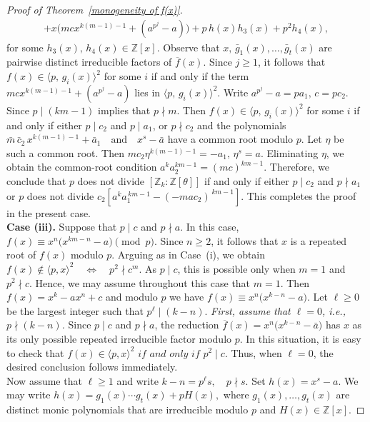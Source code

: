 \documentclass[10pt,a4paper]{amsart}
\newcommand{\Z}{\mathbb{Z}}
\begin{document}
\begin{proof}[Proof of Theorem~\ref{monogeneity of f(x)}]
\begin{align*}
   + x\bigl(m c x^{k(m-1)-1} + (a^{p^{j}}-a)\bigr)
   + p\,h(x)h_{3}(x) + p^{2}h_{4}(x),
\end{align*}
for some $h_{3}(x),\,h_{4}(x)\in\mathbb{Z}[x]$. Observe that $x,\,\bar g_{1}(x),\ldots,\bar g_{t}(x)$ are pairwise distinct irreducible factors of $\overline{f}(x)$.
Since $j\ge1$, it follows that $f(x)\in\langle p,\, g_i(x)\rangle^{2}$
for some $i$ if and only if the term $m c x^{k(m-1)-1} + (a^{p^{j}}-a)$ lies in $\langle p,\, g_i(x)\rangle^{2}$. Write $a^{p^{j}}-a=pa_{1},\,c=pc_{2}.$ Since $p\mid (km-1)$ implies that $p\nmid m$. Then $f(x)\in\langle p,\, g_i(x)\rangle^{2}$ for some $i$ if and only if either $p\mid c_{2}$ and $p\mid a_{1}$, or $p\nmid c_{2}$ and the polynomials $\bar m\,\bar c_{2}\,x^{k(m-1)-1}+\bar a_{1}
\quad\text{and}\quad
x^{s}-\bar a$ have a common root modulo $p$. Let $\eta$ be such a common root. Then $m c_{2}\eta^{k(m-1)-1}=-a_{1},
\,
\eta^{s}=a.$ Eliminating $\eta$, we obtain the common-root condition $a^ka_2^{km-1}=(mc)^{km-1}.$ Therefore, we conclude that $p$ does not divide $[\Z_k :\Z[\theta]]$ if and only if either $p\mid c_2$ and $p\nmid a_1$ or $p$ does not divide $c_2[a^ka_1^{\,km-1}-(-mac_2)^{\,km-1}]$. This completes the proof in the present case. \\[2mm]
\textbf{Case (iii).} Suppose that $p\mid c$ and $p\nmid a$. In this case,
$f(x)\equiv x^{n}\bigl(x^{km-n}-a\bigr)\pmod{p}.$ Since $n\ge2$, it follows that $x$ is a repeated root of $f(x)$ modulo $p$. Arguing as in Case~(i), we obtain $f(x)\notin\langle p,x\rangle^2
\quad \Longleftrightarrow \quad
p^{2}\nmid c^{m}.$ As $p\mid c$, this is possible only when $m=1$ and $p^{2}\nmid c$. Hence, we may assume throughout this case that $m=1$. Then $f(x)=x^{k}-ax^{n}+c$ and modulo $p$ we have $f(x)\equiv x^{n}\bigl(x^{k-n}-a\bigr).$ Let $\ell\ge0$ be the largest integer such that $p^{\ell}\mid(k-n)$.
\medskip
\emph{First, assume that $\ell=0$, i.e., \ $p\nmid(k-n)$.}
Since $p\mid c$ and $p\nmid a$, the reduction $\overline{f}(x)=x^{n}\bigl(x^{k-n}-\bar a\bigr)$ has $x$ as its only possible repeated irreducible factor modulo $p$. In this situation, it is easy to check that $f(x)\in\langle p,x\rangle^{2}
\textit{ if and only if }
p^{2}\mid c.$ Thus, when $\ell=0$, the desired conclusion follows immediately.\\
Now assume that $\ell\ge1$ and write $k-n=p^{\ell}s,
\quad p\nmid s.$ Set $h(x)=x^{s}-a.$ We may write $h(x)=g_{1}(x)\cdots g_{t}(x)+pH(x),$ where $g_{1}(x),\dots,g_{t}(x)$ are distinct monic polynomials that are irreducible modulo $p$ and $H(x)\in\mathbb{Z}[x]$.

\end{proof}
\end{document}
